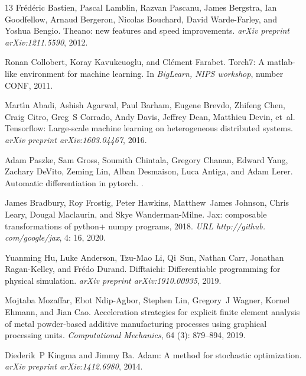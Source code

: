 \documentclass{article}
\begin{document}
\begin{thebibliography}{13}
Fr{\'e}d{\'e}ric Bastien, Pascal Lamblin, Razvan Pascanu, James Bergstra, Ian
  Goodfellow, Arnaud Bergeron, Nicolas Bouchard, David Warde-Farley, and Yoshua
  Bengio.
\newblock Theano: new features and speed improvements.
\newblock \emph{arXiv preprint arXiv:1211.5590}, 2012.

Ronan Collobert, Koray Kavukcuoglu, and Cl{\'e}ment Farabet.
\newblock Torch7: A matlab-like environment for machine learning.
\newblock In \emph{BigLearn, NIPS workshop}, number CONF, 2011.

Mart{\'\i}n Abadi, Ashish Agarwal, Paul Barham, Eugene Brevdo, Zhifeng Chen,
  Craig Citro, Greg~S Corrado, Andy Davis, Jeffrey Dean, Matthieu Devin, et~al.
\newblock Tensorflow: Large-scale machine learning on heterogeneous distributed
  systems.
\newblock \emph{arXiv preprint arXiv:1603.04467}, 2016.

Adam Paszke, Sam Gross, Soumith Chintala, Gregory Chanan, Edward Yang, Zachary
  DeVito, Zeming Lin, Alban Desmaison, Luca Antiga, and Adam Lerer.
\newblock Automatic differentiation in pytorch.
.

James Bradbury, Roy Frostig, Peter Hawkins, Matthew~James Johnson, Chris Leary,
  Dougal Maclaurin, and Skye Wanderman-Milne.
\newblock Jax: composable transformations of python+ numpy programs, 2018.
\newblock \emph{URL http://github. com/google/jax}, 4: 16, 2020.

Yuanming Hu, Luke Anderson, Tzu-Mao Li, Qi~Sun, Nathan Carr, Jonathan
  Ragan-Kelley, and Fr{\'e}do Durand.
\newblock Difftaichi: Differentiable programming for physical simulation.
\newblock \emph{arXiv preprint arXiv:1910.00935}, 2019{}.

Mojtaba Mozaffar, Ebot Ndip-Agbor, Stephen Lin, Gregory~J Wagner, Kornel
  Ehmann, and Jian Cao.
\newblock Acceleration strategies for explicit finite element analysis of metal
  powder-based additive manufacturing processes using graphical processing
  units.
\newblock \emph{Computational Mechanics}, 64 (3): 879--894,
  2019.

Diederik~P Kingma and Jimmy Ba.
\newblock Adam: A method for stochastic optimization.
\newblock \emph{arXiv preprint arXiv:1412.6980}, 2014.

\end{thebibliography}
\end{document}
